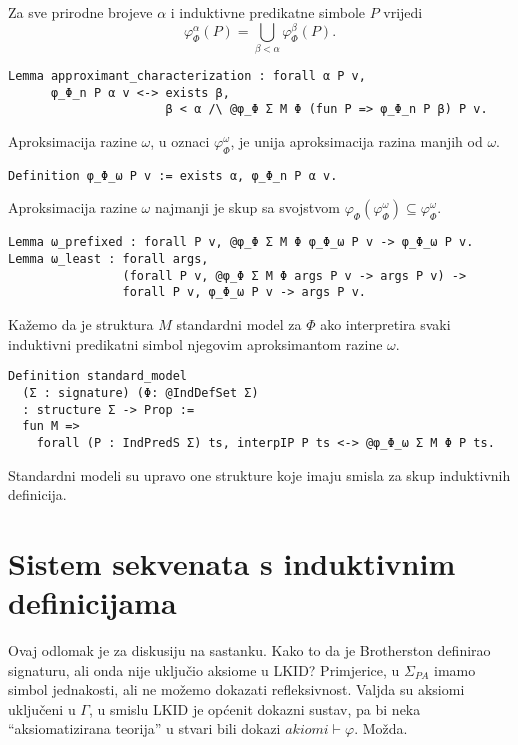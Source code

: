 \begin{lemma}
  Za sve prirodne brojeve \(\alpha\) i induktivne predikatne simbole \(P\) vrijedi
  \[
    \varphi_{\Phi}^{\alpha}(P) = \bigcup_{\beta < \alpha} \varphi_{\Phi}^{\beta}(P).
  \]
\begin{verbatim}
Lemma approximant_characterization : forall α P v,
      φ_Φ_n P α v <-> exists β,
                      β < α /\ @φ_Φ Σ M Φ (fun P => φ_Φ_n P β) P v.
\end{verbatim}
\end{lemma}

\begin{definition}
  Aproksimacija razine \(\omega\), u oznaci \(\varphi_{\Phi}^{\omega}\), je unija aproksimacija razina manjih od \(\omega\).
\begin{verbatim}
Definition φ_Φ_ω P v := exists α, φ_Φ_n P α v.
\end{verbatim}
\end{definition}

\begin{lemma}
  Aproksimacija razine \(\omega\) najmanji je skup sa svojstvom \(\varphi_{\Phi}(\varphi_{\Phi}^{\omega}) \subseteq \varphi_{\Phi}^{\omega}\).
\begin{verbatim}
Lemma ω_prefixed : forall P v, @φ_Φ Σ M Φ φ_Φ_ω P v -> φ_Φ_ω P v.
Lemma ω_least : forall args,
                (forall P v, @φ_Φ Σ M Φ args P v -> args P v) ->
                forall P v, φ_Φ_ω P v -> args P v.
\end{verbatim}
\end{lemma}

\begin{definition}
  Kažemo da je struktura \(M\) standardni model za \(\Phi\) ako
  interpretira svaki induktivni predikatni simbol njegovim aproksimantom razine \(\omega\).
\begin{verbatim}
Definition standard_model
  (Σ : signature) (Φ: @IndDefSet Σ)
  : structure Σ -> Prop :=
  fun M =>
    forall (P : IndPredS Σ) ts, interpIP P ts <-> @φ_Φ_ω Σ M Φ P ts.
\end{verbatim}
\end{definition}
\noindent Standardni modeli su upravo one strukture koje imaju smisla za skup induktivnih definicija.


\section{Sistem sekvenata s induktivnim definicijama}\label{sec:sistem-sekvenata}
Ovaj odlomak je za diskusiju na sastanku. Kako to da je Brotherston definirao signaturu, ali onda nije uključio aksiome u LKID?
Primjerice, u \( \Sigma_{PA} \) imamo simbol jednakosti, ali ne možemo dokazati refleksivnost.
Valjda su aksiomi uključeni u \(\Gamma\), u smislu LKID je općenit dokazni sustav, pa bi neka
``aksiomatizirana teorija'' u stvari bili dokazi \(\mathit{akiomi} \vdash \varphi\). Možda.

